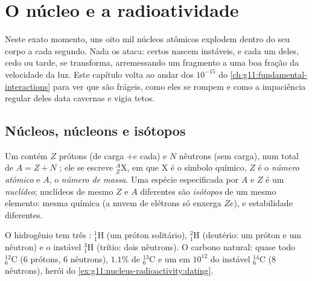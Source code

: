 \chapter{O núcleo e a radioatividade}\label{ch:g11:nucleus-radioactivity}

Neste exato momento, uns oito mil núcleos atômicos explodem dentro do seu
corpo a cada segundo. Nada os ataca: certos  nascem instáveis, e
cada um deles, cedo ou tarde, se transforma, arremessando um fragmento a
uma boa fração da velocidade da luz. Este capítulo volta ao andar dos
$10^{-15}$  do \cref{ch:g11:fundamental-interactions} para ver que
 são frágeis, como eles se rompem e como a impaciência regular
deles data cavernas e vigia tetos.

\section{Núcleos, núcleons e isótopos}

\begin{definition}\label{def:g11:nucleus-radioactivity:notation}
Um  contém $Z$ prótons (de carga $+e$ cada) e $N$ nêutrons (sem
carga), num total de $A = Z + N$ ; ele se escreve
${}^{A}_{Z}\mathrm{X}$, em que $\mathrm X$ é o símbolo químico, $Z$ é o
\emph{número atômico} e $A$, o \emph{número de
massa}. Uma espécie especificada por $A$ e $Z$ é um
\emph{nuclídeo}; nuclídeos de mesmo $Z$ e $A$ diferentes
são \emph{isótopos} de um mesmo elemento: mesma química (a
nuvem de elétrons só enxerga $Ze$),  e estabilidade diferentes.
\end{definition}

\begin{example}\label{ex:g11:nucleus-radioactivity:hc}
O hidrogênio tem três : ${}^{1}_{1}\mathrm{H}$ (um próton
solitário), ${}^{2}_{1}\mathrm{H}$ (deutério: um próton e um nêutron) e o
instável ${}^{3}_{1}\mathrm{H}$ (trítio: dois nêutrons). O carbono
natural: quase todo ${}^{12}_{6}\mathrm{C}$ ($6$ prótons, $6$ nêutrons),
$1.1\%$ de ${}^{13}_{6}\mathrm{C}$ e um  em $10^{12}$ do instável
${}^{14}_{6}\mathrm{C}$ ($8$ nêutrons), herói do
\cref{ex:g11:nucleus-radioactivity:dating}.
\end{example}


